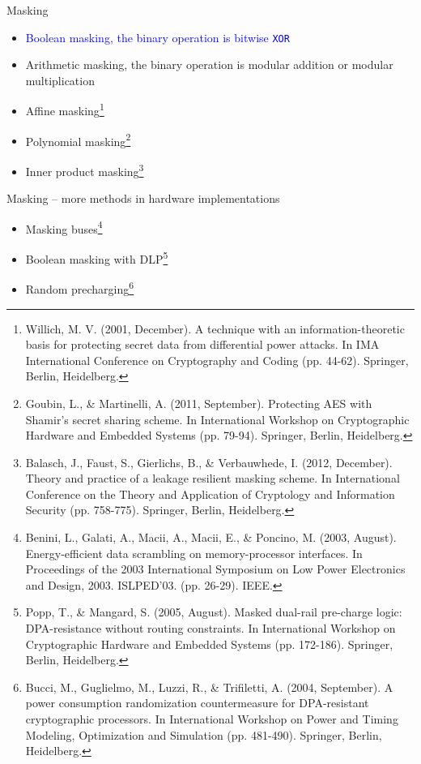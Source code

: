 \begin{frame}{Masking}
    \begin{itemize}
        \item \textcolor{blue}{Boolean masking, the binary operation is bitwise \texttt{XOR}}
        \item Arithmetic masking, the binary operation is modular addition or modular multiplication
        \item Affine masking\footnote{Willich, M. V. (2001, December). A technique with an information-theoretic basis for protecting secret data from differential power attacks. In IMA International Conference on Cryptography and Coding (pp. 44-62). Springer, Berlin, Heidelberg.}
        \item Polynomial masking\footnote{Goubin, L., \& Martinelli, A. (2011, September). Protecting AES with Shamir’s secret sharing scheme. In International Workshop on Cryptographic Hardware and Embedded Systems (pp. 79-94). Springer, Berlin, Heidelberg.}
        \item Inner product masking\footnote{Balasch, J., Faust, S., Gierlichs, B., \& Verbauwhede, I. (2012, December). Theory and practice of a leakage resilient masking scheme. In International Conference on the Theory and Application of Cryptology and Information Security (pp. 758-775). Springer, Berlin, Heidelberg.}
    \end{itemize}
\end{frame}

\begin{frame}{Masking -- more methods in hardware implementations}
    \begin{itemize}
        \item Masking buses\footnote{Benini, L., Galati, A., Macii, A., Macii, E., \& Poncino, M. (2003, August). Energy-efficient data scrambling on memory-processor interfaces. In Proceedings of the 2003 International Symposium on Low Power Electronics and Design, 2003. ISLPED'03. (pp. 26-29). IEEE.}
        \item Boolean masking with DLP\footnote{Popp, T., \& Mangard, S. (2005, August). Masked dual-rail pre-charge logic: DPA-resistance without routing constraints. In International Workshop on Cryptographic Hardware and Embedded Systems (pp. 172-186). Springer, Berlin, Heidelberg.}
        \item Random precharging\footnote{Bucci, M., Guglielmo, M., Luzzi, R., \& Trifiletti, A. (2004, September). A power consumption randomization countermeasure for DPA-resistant cryptographic processors. In International Workshop on Power and Timing Modeling, Optimization and Simulation (pp. 481-490). Springer, Berlin, Heidelberg.}
    \end{itemize}
\end{frame}

